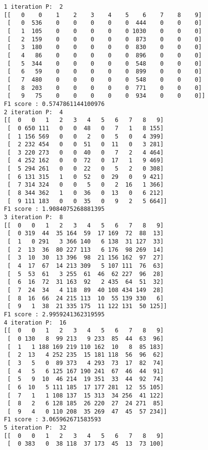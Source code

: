 \documentclass[11pt]{article}
\begin{document}
    \begin{Verbatim}[commandchars=\\\{\}]
1 iteration P:  2
[[   0    0    1    2    3    4    5    6    7    8    9]
 [   0  536    0    0    0    0    0  444    0    0    0]
 [   1  105    0    0    0    0    0 1030    0    0    0]
 [   2  159    0    0    0    0    0  873    0    0    0]
 [   3  180    0    0    0    0    0  830    0    0    0]
 [   4   86    0    0    0    0    0  896    0    0    0]
 [   5  344    0    0    0    0    0  548    0    0    0]
 [   6   59    0    0    0    0    0  899    0    0    0]
 [   7  480    0    0    0    0    0  548    0    0    0]
 [   8  203    0    0    0    0    0  771    0    0    0]
 [   9   75    0    0    0    0    0  934    0    0    0]]
F1 score : 0.5747861144100976
2 iteration P:  4
[[  0   0   1   2   3   4   5   6   7   8   9]
 [  0 650 111   0   0  48   0   7   1   8 155]
 [  1 156 569   0   0   2   0   5   0   4 399]
 [  2 232 454   0   0  51   0  11   0   3 281]
 [  3 220 273   0   0  40   0   7   2   4 464]
 [  4 252 162   0   0  72   0  17   1   9 469]
 [  5 294 261   0   0  22   0   5   2   0 308]
 [  6 131 315   1   0  52   0  29   0   9 421]
 [  7 314 324   0   0   5   0   2  16   1 366]
 [  8 344 362   1   0  36   0  13   0   6 212]
 [  9 111 183   0   0  35   0   9   2   5 664]]
F1 score : 1.9084075268881395
3 iteration P:  8
[[  0   0   1   2   3   4   5   6   7   8   9]
 [  0 319  44  35 164  59  17 169  72  88  13]
 [  1   0 291   3 366 140   6 138  31 127  33]
 [  2  13  36  80 227 113   6 176  98 269  14]
 [  3  10  30  13 396  98  21 156 162  97  27]
 [  4  17  67  14 213 309   5 107 111  76  63]
 [  5  53  61   3 255  61  46  62 227  96  28]
 [  6  16  72  31 163  92   2 435  64  51  32]
 [  7  24  34   4 118  89  40 108 434 149  28]
 [  8  16  66  24 215 113  10  55 139 330   6]
 [  9   1  38  21 335 175  11 122 131  50 125]]
F1 score : 2.9959241362319595
4 iteration P:  16
[[  0   0   1   2   3   4   5   6   7   8   9]
 [  0 130   8  99 213   9 233  85  44  63  96]
 [  1   1 188 169 219 110 162  10   8  85 183]
 [  2  13   4 252 235  15 181 118  56  96  62]
 [  3   5   0  89 373   4 293  73  17  82  74]
 [  4   5   6 125 167 190 241  67  46  44  91]
 [  5   9  10  46 214  19 351  33  44  92  74]
 [  6  10   5 111 185  17 177 281  12  55 105]
 [  7   1   1 108 137  15 313  34 256  41 122]
 [  8   2   6 128 185  26 220  27  24 271  85]
 [  9   4   0 110 208  35 269  47  45  57 234]]
F1 score : 3.065962671583593
5 iteration P:  32
[[  0   0   1   2   3   4   5   6   7   8   9]
 [  0 383   0  38 118  37 173  45  13  73 100]

\end{Verbatim}
\end{document}
